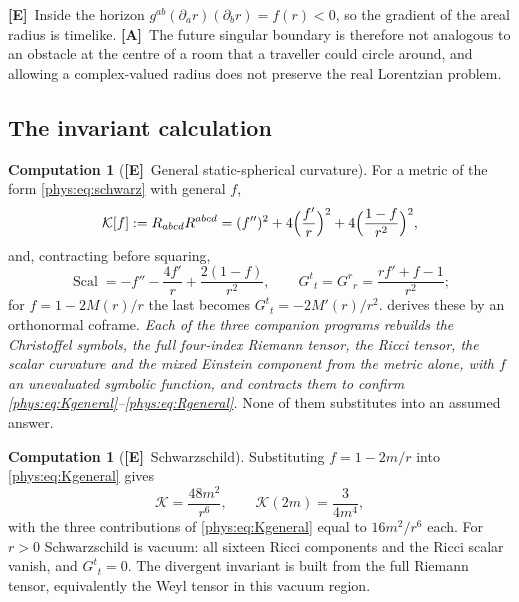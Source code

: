 \documentclass[11pt,letterpaper]{article}
\numberwithin{equation}{section}
\theoremstyle{definition}
\newtheorem{computation}[theorem]{Computation}
\theoremstyle{remark}
\newcommand{\Kret}{\mathcal K}
\DeclareMathOperator{\Scal}{Scal}
\newcommand{\TE}{\textcolor{TierE}{\textsf{\bfseries[E]}}}
\newcommand{\TA}{\textcolor{TierA}{\textsf{\bfseries[A]}}}
\begin{document}
\TE\ Inside the horizon $g^{ab}(\partial_{a}r)(\partial_{b}r)=f(r)<0$, so the
gradient of the areal radius is timelike. \TA\ The future singular boundary is
therefore not analogous to an obstacle at the centre of a room that a traveller
could circle around, and allowing a complex-valued radius does not preserve the
real Lorentzian problem.

\subsection{The invariant calculation}
\label{phys:sub:invariant}

\begin{computation}[\TE\ General static-spherical curvature]
\label{phys:comp:Kgeneral}
For a metric of the form \eqref{phys:eq:schwarz} with general $f$,
\begin{equation}\label{phys:eq:Kgeneral}
\Kret[f]:=R_{abcd}R^{abcd}
=(f'')^{2}+4\Bigl(\frac{f'}{r}\Bigr)^{2}
+4\Bigl(\frac{1-f}{r^{2}}\Bigr)^{2},
\end{equation}
and, contracting before squaring,
\begin{equation}\label{phys:eq:Rgeneral}
\Scal=-f''-\frac{4f'}{r}+\frac{2(1-f)}{r^{2}},
\qquad
G^{t}{}_{t}=G^{r}{}_{r}=\frac{rf'+f-1}{r^{2}};
\end{equation}
for $f=1-2M(r)/r$ the last becomes $G^{t}{}_{t}=-2M'(r)/r^{2}$.
 derives these by an orthonormal coframe.
\emph{Each of the three companion programs rebuilds the Christoffel symbols,
the full four-index Riemann tensor, the Ricci tensor, the scalar curvature and
the mixed Einstein component from the metric alone, with $f$ an unevaluated
symbolic function, and contracts them to confirm
\eqref{phys:eq:Kgeneral}--\eqref{phys:eq:Rgeneral}.} None of them substitutes
into an assumed answer.
\end{computation}

\begin{computation}[\TE\ Schwarzschild]
\label{phys:comp:Kschwarz}
Substituting $f=1-2m/r$ into \eqref{phys:eq:Kgeneral} gives
\begin{equation}\label{phys:eq:Kschwarz}
\Kret=\frac{48m^{2}}{r^{6}},\qquad
\Kret(2m)=\frac{3}{4m^{4}},
\end{equation}
with the three contributions of \eqref{phys:eq:Kgeneral} equal to
$16m^{2}/r^{6}$ each. For $r>0$ Schwarzschild is vacuum: all sixteen Ricci
components and the Ricci scalar vanish, and $G^{t}{}_{t}=0$. The divergent
invariant is built from the full Riemann tensor, equivalently the Weyl tensor
in this vacuum region.
\end{computation}
\end{document}
